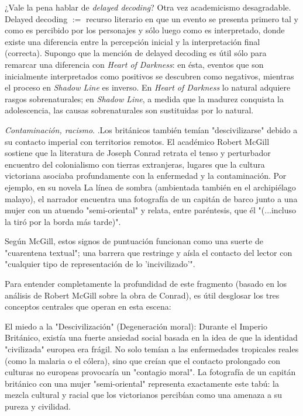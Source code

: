 \documentclass[a4paper, 12pt]{article}
\begin{document}
¿Vale la pena hablar de \textit{delayed decoding}? Otra vez academicismo
desagradable. Delayed decoding $:=$ recurso literario en que un evento se
presenta primero tal y como es percibido por los personajes y sólo luego como es
interpretado, donde existe una diferencia entre la percepción inicial y la
interpretación final (correcta). Supongo que la mención de delayed decoding es
útil sólo para remarcar una diferencia con \textit{Heart of Darkness}: en ésta,
eventos que son inicialmente interpretados como positivos se descubren como
negativos, mientras el proceso en \textit{Shadow Line} es inverso. En
\textit{Heart of Darkness} lo natural adquiere rasgos sobrenaturales; en
\textit{Shadow Line}, a medida que la madurez conquista la adolescencia, las
causas sobrenaturales son sustituidas por lo natural.

\textit{Contaminación, racismo}. .Los británicos también temían "descivilizarse"
debido a su contacto imperial con territorios remotos. El académico Robert
McGill sostiene que la literatura de Joseph Conrad retrata el tenso y
perturbador encuentro del colonialismo con tierras extranjeras, lugares que la
cultura victoriana asociaba profundamente con la enfermedad y la contaminación.
Por ejemplo, en su novela La línea de sombra (ambientada también en el
archipiélago malayo), el narrador encuentra una fotografía de un capitán de
barco junto a una mujer con un atuendo "semi-oriental" y relata, entre
paréntesis, que él "(...incluso la tiró por la borda más tarde)".

Según McGill, estos signos de puntuación funcionan como una suerte de
"cuarentena textual"; una barrera que restringe y aísla el contacto del lector
con "cualquier tipo de representación de lo 'incivilizado'".

Para entender completamente la profundidad de este fragmento (basado en los
análisis de Robert McGill sobre la obra de Conrad), es útil desglosar los tres
conceptos centrales que operan en esta escena:

El miedo a la "Descivilización" (Degeneración moral): Durante el Imperio
Británico, existía una fuerte ansiedad social basada en la idea de que la
identidad "civilizada" europea era frágil. No solo temían a las enfermedades
tropicales reales (como la malaria o el cólera), sino que creían que el contacto
prolongado con culturas no europeas provocaría un "contagio moral". La
fotografía de un capitán británico con una mujer "semi-oriental" representa
exactamente este tabú: la mezcla cultural y racial que los victorianos percibían
como una amenaza a su pureza y civilidad.
\end{document}
